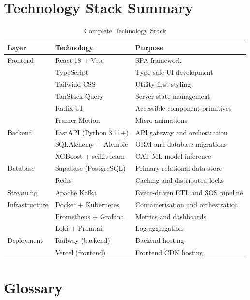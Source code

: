 \documentclass[12pt,a4paper]{report}
\begin{document}
\appendix
\chapter{Technology Stack Summary}

\begin{table}[h!]
\centering
\caption{Complete Technology Stack}
\begin{tabularx}{\textwidth}{llX}
\toprule
\textbf{Layer} & \textbf{Technology} & \textbf{Purpose} \\
\midrule
Frontend & React 18 + Vite & SPA framework \\
 & TypeScript & Type-safe UI development \\
 & Tailwind CSS & Utility-first styling \\
 & TanStack Query & Server state management \\
 & Radix UI & Accessible component primitives \\
 & Framer Motion & Micro-animations \\
\midrule
Backend & FastAPI (Python 3.11+) & API gateway and orchestration \\
 & SQLAlchemy + Alembic & ORM and database migrations \\
 & XGBoost + scikit-learn & CAT ML model inference \\
\midrule
Database & Supabase (PostgreSQL) & Primary relational data store \\
 & Redis & Caching and distributed locks \\
\midrule
Streaming & Apache Kafka & Event-driven ETL and SOS pipeline \\
\midrule
Infrastructure & Docker + Kubernetes & Containerisation and orchestration \\
 & Prometheus + Grafana & Metrics and dashboards \\
 & Loki + Promtail & Log aggregation \\
\midrule
Deployment & Railway (backend) & Backend hosting \\
 & Vercel (frontend) & Frontend CDN hosting \\
\bottomrule
\end{tabularx}
\end{table}

\chapter{Glossary}
\end{document}
